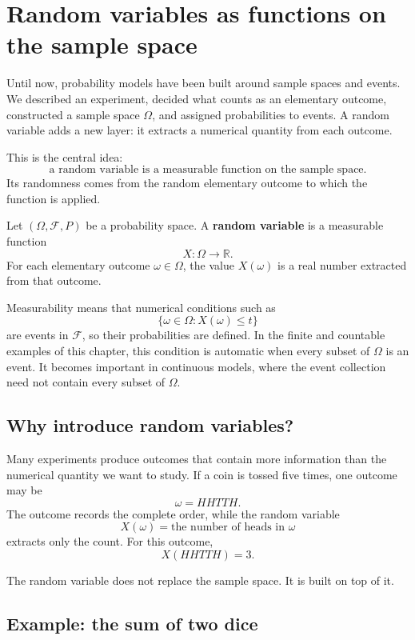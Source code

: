 \section{Random variables as functions on the sample space}

Until now, probability models have been built around sample spaces and events.
We described an experiment, decided what counts as an elementary outcome,
constructed a sample space \(\Omega\), and assigned probabilities to events. A
random variable adds a new layer: it extracts a numerical quantity from each
outcome.

This is the central idea:
\[
\text{a random variable is a measurable function on the sample space.}
\]
Its randomness comes from the random elementary outcome to which the function is
applied.

\begin{definitionbox}
Let \((\Omega,\mathcal F,P)\) be a probability space. A \textbf{random variable}
is a measurable function
\[
X:\Omega\to\mathbb R.
\]
For each elementary outcome \(\omega\in\Omega\), the value \(X(\omega)\) is a
real number extracted from that outcome.
\end{definitionbox}

Measurability means that numerical conditions such as
\[
\{\omega\in\Omega:X(\omega)\leq t\}
\]
are events in \(\mathcal F\), so their probabilities are defined. In the finite
and countable examples of this chapter, this condition is automatic when every
subset of \(\Omega\) is an event. It becomes important in continuous models,
where the event collection need not contain every subset of \(\Omega\).

\subsection*{Why introduce random variables?}

Many experiments produce outcomes that contain more information than the
numerical quantity we want to study. If a coin is tossed five times, one outcome
may be
\[
\omega=HHTTH.
\]
The outcome records the complete order, while the random variable
\[
X(\omega)=\text{the number of heads in }\omega
\]
extracts only the count. For this outcome,
\[
X(HHTTH)=3.
\]

The random variable does not replace the sample space. It is built on top of it.

\subsection*{Example: the sum of two dice}

